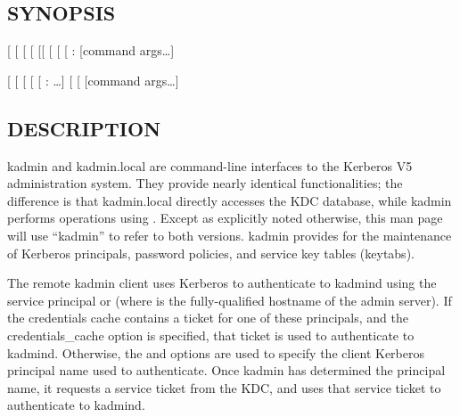 \documentclass[letterpaper,10pt,english]{sphinxmanual}
\begin{document}
\subsection{SYNOPSIS}
\label{\detokenize{admin/admin_commands/kadmin_local:synopsis}}\label{\detokenize{admin/admin_commands/kadmin_local:kadmin-synopsis}}
{[}\textbar{}\sphinxstylestrong{-N}{]}
{[} \sphinxstyleemphasis{realm}{]}
{[} \sphinxstyleemphasis{principal}{]}
{[} \sphinxstyleemphasis{query}{]}
{[}{[} \sphinxstyleemphasis{cache\_name}{]}\textbar{}{[} {[} \sphinxstyleemphasis{keytab}{]}{]}\textbar{}\sphinxstylestrong{-n}{]}
{[} \sphinxstyleemphasis{password}{]}
{[} \sphinxstyleemphasis{admin\_server}{[}:\sphinxstyleemphasis{port}{]}{]}
{[}command args…{]}

{[} \sphinxstyleemphasis{realm}{]}
{[} \sphinxstyleemphasis{principal}{]}
{[} \sphinxstyleemphasis{query}{]}
{[} \sphinxstyleemphasis{dbname}{]}
{[} : …{]}
{[}\sphinxstylestrong{-m}{]}
{[} \sphinxstyleemphasis{db\_args}{]}
{[}command args…{]}


\subsection{DESCRIPTION}
\label{\detokenize{admin/admin_commands/kadmin_local:description}}
kadmin and kadmin.local are command-line interfaces to the Kerberos V5
administration system.  They provide nearly identical functionalities;
the difference is that kadmin.local directly accesses the KDC
database, while kadmin performs operations using {\hyperref[\detokenize{admin/admin_commands/kadmind:kadmind-8}]{}}.
Except as explicitly noted otherwise, this man page will use “kadmin”
to refer to both versions.  kadmin provides for the maintenance of
Kerberos principals, password policies, and service key tables
(keytabs).

The remote kadmin client uses Kerberos to authenticate to kadmind
using the service principal  or 
(where  is the fully-qualified hostname of the admin
server).  If the credentials cache contains a ticket for one of these
principals, and the  credentials\_cache option is specified, that
ticket is used to authenticate to kadmind.  Otherwise, the  and
 options are used to specify the client Kerberos principal name
used to authenticate.  Once kadmin has determined the principal name,
it requests a service ticket from the KDC, and uses that service
ticket to authenticate to kadmind.
\end{document}
